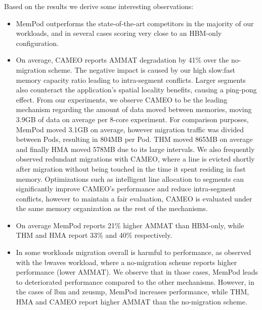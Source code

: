 Based on the results we derive some interesting observations:
\begin{itemize}[leftmargin=0.4cm]
\setlength\itemsep{0em}
	\item MemPod outperforms the state-of-the-art competitors in the majority of our workloads, and in several cases scoring very close to an HBM-only configuration. 
	\item On average, CAMEO reports AMMAT degradation by 41\% over the no-migration scheme. The negative impact is caused by our high slow:fast memory capacity ratio leading to intra-segment conflicts. Larger segments also counteract the application's spatial locality benefits, causing a ping-pong effect. From our experiments, we observe CAMEO to be the leading mechanism regarding the amount of data moved between memories, moving 3.9GB of data on average per 8-core experiment. For comparison purposes, MemPod moved 3.1GB on average, however migration traffic was divided between Pods, resulting in 804MB per Pod. THM moved 865MB on average and finally HMA moved 578MB due to its large intervals. We also frequently observed redundant migrations with CAMEO, where a line is evicted shortly after migration without being touched in the time it spent residing in fast memory. Optimizations such as intelligent line allocation to segments can significantly improve CAMEO's performance and reduce intra-segment conflicts, however to maintain a fair evaluation, CAMEO is evaluated under the same memory organization as the rest of the mechanisms.
	\item On average MemPod reports 21\% higher AMMAT than HBM-only, while THM and HMA report 33\% and 40\% respectively.
	
	\item In some workloads migration overall is harmful to performance, 
as observed with the bwaves workload, where a no-migration scheme reports 
higher performance (lower AMMAT). We observe that in those cases, MemPod leads to deteriorated performance compared to the other mechanisms. However, in the cases of lbm and zeusmp, 
MemPod increases performance, while THM, HMA and CAMEO report higher AMMAT than the no-migration scheme.


\end{itemize}
